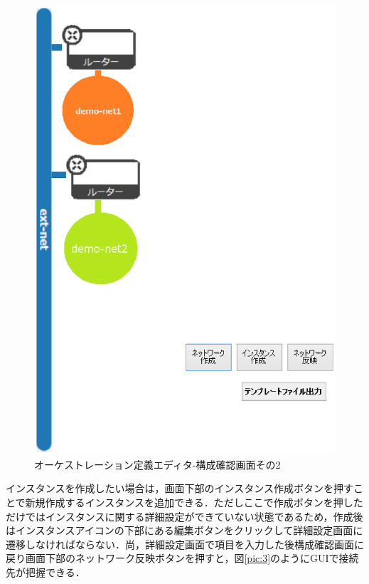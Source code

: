 \documentclass[mingoth]{kut-paper}		%
\begin{document}
		\begin{figure}[H]
			\begin{center}
				\includegraphics[scale=0.55]{Document/構成確認画面2.eps}
				\caption{オーケストレーション定義エディタ-構成確認画面その2}
				\label{pic:2}
			\end{center}
		\end{figure}
		インスタンスを作成したい場合は，画面下部のインスタンス作成ボタンを押すことで新規作成するインスタンスを追加できる．ただしここで作成ボタンを押しただけではインスタンスに関する詳細設定ができていない状態であるため，作成後はインスタンスアイコンの下部にある編集ボタンをクリックして詳細設定画面に遷移しなければならない．尚，詳細設定画面で項目を入力した後構成確認画面に戻り画面下部のネットワーク反映ボタンを押すと，図\ref{pic:3}のようにGUIで接続先が把握できる．
\end{document}
